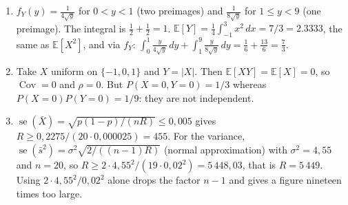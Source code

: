 \begin{enumerate}[label=\textbf{18.\arabic*}]
  \item $f_{Y}(y)=\frac{1}{4\sqrt{y}}$ for $0<y<1$ (two preimages) and
        $\frac{1}{8\sqrt{y}}$ for $1\le y<9$ (one preimage). The integral is
        $\tfrac12+\tfrac12=1$. $\mathbb{E}[Y]=\frac14\int_{-1}^{3}x^{2}\,dx=7/3
        =2.3333$, the same as $\mathbb{E}[X^{2}]$, and via $f_{Y}$:
        $\int_{0}^{1}\frac{y}{4\sqrt{y}}\,dy+\int_{1}^{9}\frac{y}{8\sqrt{y}}\,dy
        =\tfrac16+\tfrac{13}6=\tfrac73$.

  \item Take $X$ uniform on $\{-1,0,1\}$ and $Y=|X|$. Then
        $\mathbb{E}[XY]=\mathbb{E}[X]=0$, so $\operatorname{Cov}=0$ and $\rho=0$.
        But $P(X=0,Y=0)=1/3$ whereas $P(X=0)P(Y=0)=1/9$: they are not independent.

  \item 
$\operatorname{se}(\bar X)=\sqrt{p(1-p)/(nR)}\le0{,}005$ gives
        $R\ge0{,}2275/(20\cdot0{,}000025)=455$. For the variance,
        $\operatorname{se}(\bar s^{2})=\sigma^{2}\sqrt{2/((n-1)R)}$ (normal
        approximation) with $\sigma^{2}=4{,}55$ and $n=20$, so
        $R\ge2\cdot4{,}55^{2}/(19\cdot0{,}02^{2})=5\,448{,}03$, that is $R=5\,449$.
        Using $2\cdot4{,}55^{2}/0{,}02^{2}$ alone drops the factor $n-1$ and gives a
        figure nineteen times too large.
  \end{enumerate}

